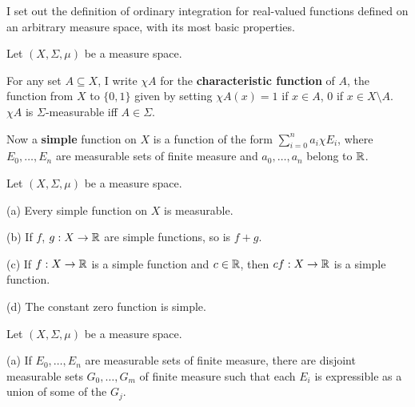 
\def\chaptername{Integration}
\def\sectionname{Definition of the integral}


I set out the definition of ordinary integration for real-valued
functions defined on an arbitrary measure space, with its most basic
properties.

  Let $(X,\Sigma,\mu)$ be a measure space.

 For any set $A\subseteq X$, I write $\chi A$
for
the {\bf characteristic function} of $A$, the function
from $X$ to $\{0,1\}$ given by setting $\chi A(x)=1$ if $x\in A$, $0$
if
$x\in X\setminus A$.   
 $\chi A$ is $\Sigma$-measurable iff $A\in\Sigma$.

 Now a {\bf simple} function on $X$ is a
function
of the form
$\sum_{i=0}^n a_i\chi E_i$, where $E_0,\ldots,E_n$ are measurable
sets of finite measure and $a_0,\ldots, a_n$ belong to
$\Bbb R$.   

 Let $(X,\Sigma,\mu)$ be a measure space.

(a) Every simple function on $X$ is measurable.

(b) If $f$, $g:X\to\Bbb R$ are simple functions, so is $f+g$.

(c) If $f:X\to \Bbb R$ is a simple function and $c\in\Bbb R$, then
$cf:X\to\Bbb R$ is a simple function.

(d) The constant zero function is simple.


 Let $(X,\Sigma,\mu)$ be a measure space.

(a) If $E_0,\ldots,E_n$ are measurable sets of finite measure,
there are disjoint measurable sets $G_0,\ldots,G_m$ of finite measure
such that each $E_i$ is expressible as a union of some of the $G_j$.

